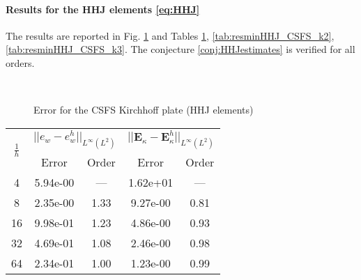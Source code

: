 \paragraph{Results for the HHJ elements \eqref{eq:HHJ}}
The results are reported in Fig. \ref{fig:errorHHJ_CSSF} and Tables \ref{tab:resminHHJ_CSFS_k1}, \ref{tab:resminHHJ_CSFS_k2}, \ref{tab:resminHHJ_CSFS_k3}. The conjecture \ref{conj:HHJestimates} is verified for all orders.

\begin{figure}[h!t]%
	\centering
	\hspace{8pt}%
	 \\
	\caption{Error for the CSFS Kirchhoff plate (HHJ elements)}%
	\label{fig:errorHHJ_CSSF}%
\end{figure}

\begin{table}[hp]
	\centering
	\begin{tabular}{ccccc}
		\hline 
		\multirow{2}{*}{$\frac{1}{h}$} & \multicolumn{2}{c}{$||e_w - e_w^h||_{L^{\infty}(L^2)}$}  & \multicolumn{2}{c}{$||\bm{E}_\kappa - \bm{E}_\kappa^h||_{L^{\infty}(L^2)}$}   \\ 
		& Error & Order  & Error & Order  \\
		\hline 
		4  & 5.94e-00 & ---  & 1.62e+01 & ---  \\ 
		8  & 2.35e-00 & 1.33 & 9.27e-00 & 0.81 \\ 
		16 & 9.98e-01 & 1.23 & 4.86e-00 & 0.93 \\ 
		32 & 4.69e-01 & 1.08 & 2.46e-00 & 0.98 \\ 
		64 & 2.34e-01 & 1.00 & 1.23e-00 & 0.99 \\ 
		\hline 
	\end{tabular} 
	\captionsetup{width=0.95\linewidth}
	\vspace{1mm}
	\label{tab:resminHHJ_CSFS_k1}
\end{table}

